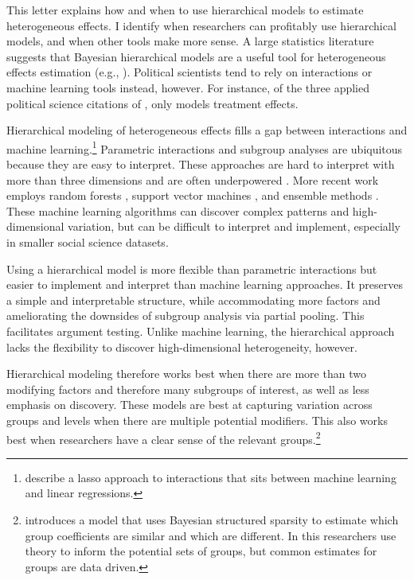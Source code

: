 \documentclass[12pt]{article}
\begin{document}
This letter explains how and when to use hierarchical models to estimate heterogeneous effects. 
I identify when researchers can profitably use hierarchical models, and when other tools make more sense. 
A large statistics literature suggests that Bayesian hierarchical models are a useful tool for  heterogeneous effects estimation (e.g., \cite{FellerGelman2015, McElreath2016, Dorieetal2022}).
Political scientists tend to rely on interactions or machine learning tools instead, however.  
For instance, of the three applied political science citations of \citet{FellerGelman2015}, only \citet{Marquardt2022} models treatment effects. 


Hierarchical modeling of heterogeneous effects fills a gap between interactions and machine learning.\footnote{\citet{BlackwellOlson2022} describe a lasso approach to interactions that sits between machine learning and linear regressions.}
Parametric interactions and subgroup analyses are ubiquitous because they are easy to interpret.
These approaches are hard to interpret with more than three dimensions and are often underpowered \citep{Simmonsetal2011}.
More recent work employs random forests \citep{GreenKern2012, WagerAthey2018}, support vector machines \citep{ImaiRatkovic2013}, and ensemble methods \citep{Grimmeretal2017, Kuenzeletal2019, Dorieetal2022}.
These machine learning algorithms can discover complex patterns and high-dimensional variation, but can be difficult to interpret and implement, especially in smaller social science datasets.

 
Using a hierarchical model is more flexible than parametric interactions but easier to implement and interpret than machine learning approaches.  
It preserves a simple and interpretable structure, while accommodating more factors and ameliorating the downsides of subgroup analysis via partial pooling. 
This facilitates argument testing.
Unlike machine learning, the hierarchical approach lacks the flexibility to discover high-dimensional heterogeneity, however.  


Hierarchical modeling therefore works best when there are more than two modifying factors and therefore many subgroups of interest, as well as less emphasis on discovery. 
These models are best at capturing variation across groups and levels when there are multiple potential modifiers.
This also works best when researchers have a clear sense of the relevant groups.\footnote{\citep{Goplerud2021} introduces a model that uses Bayesian structured sparsity to estimate which group coefficients are similar and which are different. In this researchers use theory to inform the potential sets of groups, but common estimates for groups are data driven.} 
\end{document}

